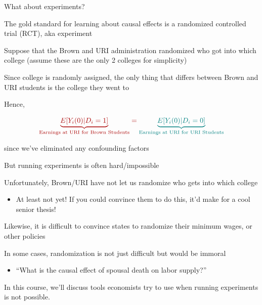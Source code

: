 \documentclass[11pt,english,handout]{beamer}
\newenvironment{wideitemize}{\itemize\addtolength{\itemsep}{10pt}}{\enditemize}
\begin{document}
\begin{frame}{What about experiments?}
\begin{wideitemize}
\item
The gold standard for learning about causal effects is a randomized controlled trial (RCT), aka experiment

\item
Suppose that the Brown and URI administration randomized who got into which college (assume these are the only 2 colleges for simplicity)

\item
Since college is randomly assigned, the only thing that differs between Brown and URI students is the college they went to

\item
Hence, 

		$$ \color{red}{ \underbrace{E[ Y_i(0) | D_i=1  ] }_{\text{Earnings at URI for Brown Students}}} = \color{teal}{ \underbrace{E[ Y_i(0) | D_i=0 ] }_{\text{Earnings at URI for URI Students}}}$$
		
		since we've eliminated any confounding factors


\end{wideitemize}
\end{frame}

\begin{frame}{But running experiments is often hard/impossible}
	\begin{wideitemize}
	
	\item
	Unfortunately, Brown/URI have not let us randomize who gets into which college
		\begin{itemize}
			\item
			At least not yet! If you could convince them to do this, it'd make for a cool senior thesis! 
		\end{itemize}


	\item
	Likewise, it is difficult to convince states to randomize their minimum wages, or other policies
	
	\item
	In some cases, randomization is not just difficult but would be immoral 
	
		\begin{itemize}
			\item 
			``What is the causal effect of spousal death on labor supply?''
		\end{itemize}	
	
	\pause
	\item
	In this course, we'll discuss tools economists try to use when running experiments is not possible.
	\end{wideitemize}
\end{frame}
\end{document}
